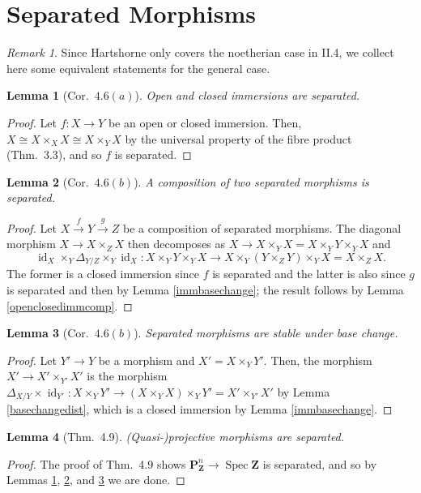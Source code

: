 \documentclass[12pt,letterpaper]{article}
\newtheorem{lemma}{Lemma}[section]
\theoremstyle{definition}
\theoremstyle{remark}
\newtheorem*{remark}{Remark}
\numberwithin{equation}{section}
\numberwithin{figure}{problem}
\DeclareMathOperator{\Spec}{Spec}
\DeclareMathOperator{\id}{id}
\begin{document}
\section{Separated Morphisms}
\begin{remark}
  Since Hartshorne only covers the noetherian case in II.4, we collect here some equivalent statements for the general case.
\end{remark}
\begin{lemma}[Cor.~$4.6(a)$]\label{separatedimm}
  Open and closed immersions are separated.
\end{lemma}
\begin{proof}
  Let $f\colon X \to Y$ be an open or closed immersion. Then, $X \cong X \times_X X \cong X \times_Y X$ by the universal property of the fibre product (Thm.~3.3), and so $f$ is separated. 
\end{proof}
\begin{lemma}[Cor.~$4.6(b)$]\label{separatedcomp}
  A composition of two separated morphisms is separated.
\end{lemma}
\begin{proof}
  Let $X \overset{f}{\to} Y \overset{g}{\to} Z$ be a composition of separated morphisms. The diagonal morphism $X \to X \times_Z X$ then decomposes as $X \to X \times_Y X = X \times_Y Y \times_Y X$ and
  \begin{equation*}
    \id_X \times_Y \Delta_{Y/Z} \times_Y \id_X \colon X \times_Y Y \times_Y X \to X \times_Y (Y \times_Z Y) \times_Y X = X \times_Z X.
  \end{equation*}
  The former is a closed immersion since $f$ is separated and the latter is also since $g$ is separated and then by Lemma \ref{immbasechange}; the result follows by Lemma \ref{openclosedimmcomp}.
\end{proof}
\begin{lemma}[Cor.~$4.6(b)$]\label{separatedbc}
  Separated morphisms are stable under base change.
\end{lemma}
\begin{proof}
  Let $Y' \to Y$ be a morphism and $X' = X \times_Y Y'$. Then, the morphism $X' \to X' \times_{Y'} X'$ is the morphism $\Delta_{X/Y} \times \id_{Y'}\colon X \times_Y Y' \to (X \times_Y X) \times_Y Y' = X' \times_{Y'} X'$ by Lemma \ref{basechangedist}, which is a closed immersion by Lemma \ref{immbasechange}.
\end{proof}
\begin{lemma}[Thm.~4.9]\label{projsep}
  (Quasi-)projective morphisms are separated.
\end{lemma}
\begin{proof}
  The proof of Thm.~4.9 shows $\mathbf{P}^n_\mathbf{Z} \to \Spec \mathbf{Z}$ is separated, and so by Lemmas \ref{separatedimm}, \ref{separatedcomp}, and \ref{separatedbc} we are done.
\end{proof}
\end{document}
